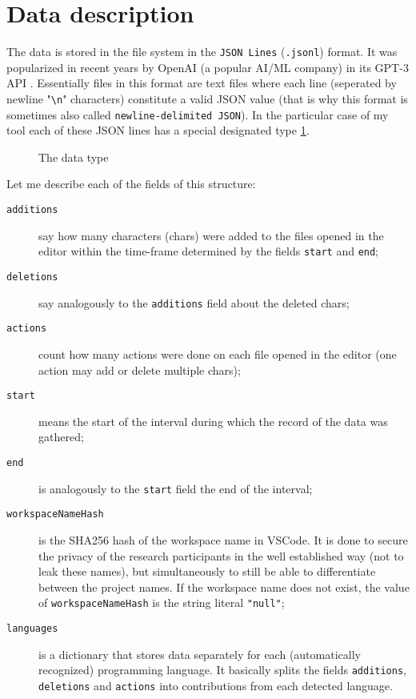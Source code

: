 \section{Data description}

The data is stored in the file system in the \texttt{JSON Lines} (\texttt{.jsonl}) \cite{JSONLines} format. It was popularized in recent years by OpenAI (a popular AI/ML company) in its GPT-3 API \cite{OpenAIGPT3}. Essentially files in this format are text files where each line (seperated by newline "\verb"\n"" characters) constitute a valid JSON value (that is why this format is sometimes also called \texttt{newline-delimited JSON}). In the particular case of my tool each of these JSON lines has a special designated type \ref{fig:event_type}.

\begin{figure}[ht]
    \centering
    
    \caption{The data type}
    \label{fig:event_type}
\end{figure}

Let me describe each of the fields of this structure:
\begin{description}
    \item[\texttt{additions}] say how many characters (chars) were added to the files opened in the editor within the time-frame determined by the fields \texttt{start} and \texttt{end};
    \item[\texttt{deletions}] say analogously to the \texttt{additions} field about the deleted chars;
    \item[\texttt{actions}] count how many actions were done on each file opened in the editor (one action may add or delete multiple chars);
    \item[\texttt{start}] means the start of the interval during which the record of the data was gathered;
    \item[\texttt{end}] is analogously to the \texttt{start} field the end of the interval;
    \item[\texttt{workspaceNameHash}] is the SHA256 \cite{NIST02SHS} hash of the workspace name in VSCode. It is done to secure the privacy of the research participants in the well established way (not to leak these names), but simultaneously to still be able to differentiate between the project names. If the workspace name does not exist, the value of \texttt{workspaceNameHash} is the string literal \texttt{"null"};
    \item[\texttt{languages}] is a dictionary that stores data separately for each (automatically recognized) programming language. It basically splits the fields \texttt{additions}, \texttt{deletions} and \texttt{actions} into contributions from each detected language.
\end{description}





